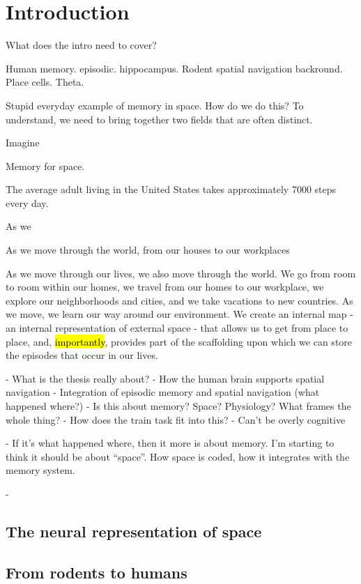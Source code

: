 \chapter{Introduction}



What does the intro need to cover?

Human memory. episodic. hippocampus.
Rodent spatial navigation backround. Place cells. Theta.


Stupid everyday example of memory in space. How do we do this? To understand, we need to bring together two fields that are often distinct. 


Imagine 

Memory for space.

The average adult living in the United States takes approximately 7000 steps every day.

As we 

As we move through the world, from our houses to our workplaces


As we move through our lives, we also move through the world. We go from room to room within our homes, we travel from our homes to our workplace, we explore our neighborhoods and cities, and we take vacations to new countries. As we move, we learn our way around our environment. We create an internal map - an internal representation of external space - that allows us to get from place to place, and, \hl{importantly}, provides part of the scaffolding upon which we can store the episodes that occur in our lives.








- What is the thesis really about?
- How the human brain supports spatial navigation
- Integration of episodic memory and spatial navigation (what happened where?)
- Is this about memory? Space? Physiology? What frames the whole thing?
- How does the train task fit into this?
- Can't be overly cognitive

- If it's what happened where, then it more is about memory. I'm starting to think it should be about ``space''. How space is coded, how it integrates with the memory system.

- 




\section{The neural representation of space}
\section{From rodents to humans}
